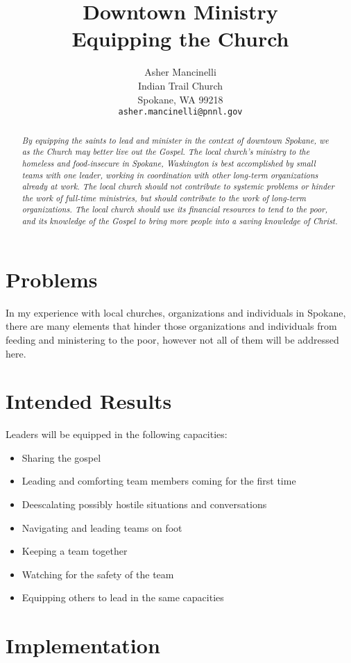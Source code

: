 \documentclass[12pt]{article}
\title{Downtown Ministry \\
        \large Equipping the Church}
\author{Asher Mancinelli \\
        Indian Trail Church \\
        Spokane, WA 99218 \\
        \texttt{asher.mancinelli@pnnl.gov} \\ }
\begin{document}
\maketitle

\begin{abstract}
    \textit{
    By equipping the saints to lead and minister in the context of downtown Spokane, we as the Church may better live out the Gospel.
    The local church's ministry to the homeless and food-insecure in Spokane, Washington is best accomplished by small teams with one leader, working in coordination with other long-term organizations already at work.
    The local church should not contribute to systemic problems or hinder the work of full-time ministries, but should contribute to the work of long-term organizations.
    The local church should use its financial resources to tend to the poor, and its knowledge of the Gospel to bring more people into a saving knowledge of Christ.
    }
\end{abstract}

\qFirstCorTwelveTwentyEight

\section{Problems}

    In my experience with local churches, organizations and individuals in Spokane, there are many elements that hinder those organizations and individuals from feeding and ministering to the poor, however not all of them will be addressed here.


\qJamesOneTwentySeven

\section{Intended Results}

    Leaders will be equipped in the following capacities:
    \begin{itemize}
        \item Sharing the gospel
        \item Leading and comforting team members coming for the first time
        \item Deescalating possibly hostile situations and conversations
        \item Navigating and leading teams on foot
        \item Keeping a team together
        \item Watching for the safety of the team
        \item Equipping others to lead in the same capacities
    \end{itemize}


\section{Implementation}

\end{document}
